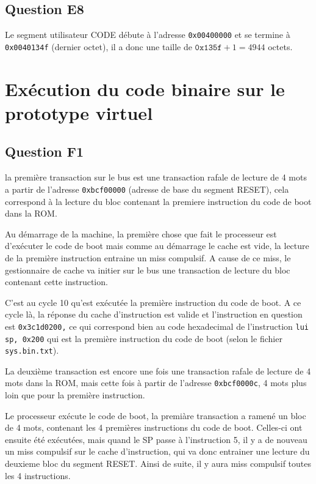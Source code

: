 \documentclass{article}
\begin{document}
\subsection{Question E8}

Le segment utilisateur CODE débute à l'adresse \texttt{0x00400000} et se termine à
\texttt{0x0040134f} (dernier octet), il a donc une taille de $\texttt{0x135f} + 1 = 4944$ octets.

\section{Exécution du code binaire sur le prototype virtuel}

\subsection{Question F1}

la première transaction sur le bus est une transaction rafale de lecture
de 4 mots a partir de l'adresse \texttt{0xbcf00000}
(adresse de base du segment RESET),
cela correspond à la lecture du bloc contenant la premiere instruction du
code de boot dans la ROM.

Au démarrage de la machine, la première chose que fait le processeur est
d'exécuter le code de boot mais comme au démarrage le cache est vide,
la lecture de la première instruction entraine un miss compulsif.
A cause de ce miss, le gestionnaire de cache va initier sur le bus
une transaction de lecture du bloc contenant cette instruction.

C'est au cycle 10 qu'est exécutée la première instruction du code de boot.
A ce cycle là, la réponse du cache d'instruction est valide et
l'instruction en question est \texttt{0x3c1d0200,} ce qui correspond bien au
code hexadecimal de l'instruction \texttt{lui sp, 0x200} qui est la première
instruction du code de boot (selon le fichier \texttt{sys.bin.txt}).

La deuxième transaction est encore une fois une transaction rafale de lecture
de 4 mots dans la ROM, mais cette fois à partir de l'adresse \texttt{0xbcf0000c},
4 mots plus loin que pour la première instruction.

Le processeur exécute le code de boot, la premiàre transaction a ramené un bloc
de 4 mots, contenant les 4 premières instructions du code de boot.
Celles-ci ont ensuite été exécutées, mais quand le SP passe à l'instruction 5,
il y a de nouveau un miss compulsif sur le cache d'instruction, qui va donc
entrainer une lecture du deuxieme bloc du segment RESET.
Ainsi de suite, il y aura miss compulsif toutes les 4 instructions.
\end{document}
